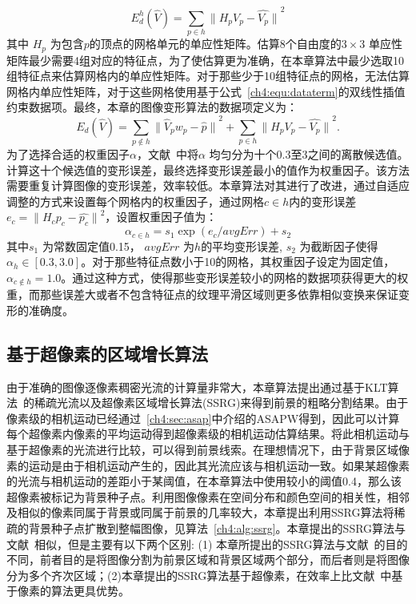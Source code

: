  $$E^{h}_{d}(\hat{V}) = \sum_{p\in h}{\parallel H_{p}V_{p} - \hat{V_{p}}\parallel}^2$$
其中 $H_{p}$ 为包含$p$的顶点的网格单元的单应性矩阵。估算8个自由度的$3\times3$ 单应性矩阵最少需要4组对应的特征点，为了使估算更为准确，在本章算法中最少选取10组特征点来估算网格内的单应性矩阵。对于那些少于10组特征点的网格，无法估算网格内单应性矩阵，对于这些网格使用基于公式~\ref{ch4:equ:dataterm}的双线性插值约束数据项。最终，本章的图像变形算法的数据项定义为：
$${E}_{d}(\hat{V}) = \sum_{p \notin h}{\parallel\hat{V}_{p}{w}_{p}- \hat{p}\parallel}^{2} +
\sum_{p\in h}{\parallel {H_{p}V_{p} - \hat{V_{p}}}\parallel}^2.$$
为了选择合适的权重因子$\alpha$，文献~中将$\alpha$ 均匀分为十个0.3至3之间的离散候选值。计算这十个候选值的变形误差，最终选择变形误差最小的值作为权重因子。该方法需要重复计算图像的变形误差，效率较低。本章算法对其进行了改进，通过自适应调整的方式来设置每个网格内的权重因子，通过网格$c \in h$内的变形误差$e_{c} = {\parallel H_{c}p_{c} - \hat{p_{c}} \parallel}^2 $，设置权重因子值为：
 $$ \alpha_{c\in h} = s_{1}\exp({e_{c}/avgErr})+ s_{2} $$
 其中$s_{1}$ 为常数固定值0.15， $avgErr$ 为$h$的平均变形误差, $s_{2}$ 为截断因子使得 $\alpha_{h} \in [0.3,3.0]$。对于那些特征点数小于10的网格，其权重因子设定为固定值， $\alpha_{c \notin h} = 1.0$。通过这种方式，使得那些变形误差较小的网格的数据项获得更大的权重，而那些误差大或者不包含特征点的纹理平滑区域则更多依靠相似变换来保证变形的准确度。
\subsection{基于超像素的区域增长算法}
\label{ch4:sec:sub:ssrg}
由于准确的图像逐像素稠密光流的计算量非常大，本章算法提出通过基于KLT算法~\cite{KLT}的稀疏光流以及超像素区域增长算法(SSRG)来得到前景的粗略分割结果。由于像素级的相机运动已经通过~\ref{ch4:sec:asap}中介绍的ASAPW得到，因此可以计算每个超像素内像素的平均运动得到超像素级的相机运动估算结果。将此相机运动与基于超像素的光流进行比较，可以得到前景线索。在理想情况下，由于背景区域像素的运动是由于相机运动产生的，因此其光流应该与相机运动一致。如果某超像素的光流与相机运动的差距小于某阈值，在本章算法中使用较小的阈值0.4，那么该超像素被标记为背景种子点。利用图像像素在空间分布和颜色空间的相关性，相邻及相似的像素同属于背景或同属于前景的几率较大，本章提出利用SSRG算法将稀疏的背景种子点扩散到整幅图像，见算法~\ref{ch4:alg:ssrg}。本章提出的SSRG算法与文献~相似，但是主要有以下两个区别: (1) 本章所提出的SSRG算法与文献~的目的不同，前者目的是将图像分割为前景区域和背景区域两个部分，而后者则是将图像分为多个齐次区域；(2)本章提出的SSRG算法基于超像素，在效率上比文献~中基于像素的算法更具优势。

